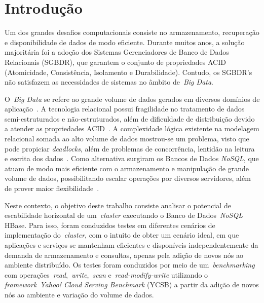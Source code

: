 \documentclass[12pt]{article}
\begin{document}
\section{Introdução}
\label{sec:introducao}
 
Um dos grandes desafios computacionais consiste no armazenamento, recuperação e disponibilidade de dados de modo eficiente. Durante muitos anos, a solução majoritária foi a adoção dos Sistemas Gerenciadores de Banco de Dados Relacionais (SGBDR), que garantem o conjunto de propriedades ACID (Atomicidade, Consistência, Isolamento e Durabilidade). Contudo, os SGBDR’s não satisfazem as necessidades de sistemas no âmbito de~\emph{Big Data}.%
 
O~\textit{Big Data} se refere ao grande volume de dados gerados em diversos domínios de aplicação~\cite{han2011survey}. A tecnologia relacional possui fragilidade no tratamento de dados semi-estruturados e não-estruturados, além de dificuldade de distribuição devido a atender as propriedades ACID~\cite{aparicio:2016}. 
A complexidade lógica existente na modelagem relacional somada ao alto volume de dados mostrou-se um problema, visto que pode propiciar \textit{deadlocks}, além de problemas de concorrência, lentidão na leitura e escrita dos dados~\cite{han2011survey}. 
Como alternativa surgiram os Bancos de Dados \textit{NoSQL}, que atuam de modo mais eficiente com o armazenamento e manipulação de grande volume de dados, possibilitando escalar operações por diversos servidores, além de prover maior flexibilidade~\cite{ramesh:2016}.

Neste contexto, o objetivo deste trabalho consiste analisar o potencial de escabilidade horizontal de um~\emph{cluster} executando o Banco de Dados~\emph{NoSQL} HBase.  Para isso, foram conduzidos testes em diferentes cenários de implementação do~\emph{cluster}, com o intuito de obter um cenário ideal, em que aplicações e serviços se mantenham eficientes e disponíveis independentemente da demanda de armazenamento e consultas, apenas pela adição de novos nós ao ambiente distribuído. Os testes foram conduzidos por meio de um~\emph{benchmarking} com operações~\emph{read},~\emph{write},~\emph{scan} e~\emph{read-modify-write} utilizando o \textit{framework}~\emph{Yahoo! Cloud Serving Benchmark} (YCSB) a partir da adição de novos nós ao ambiente e variação do volume de dados.

\end{document}
